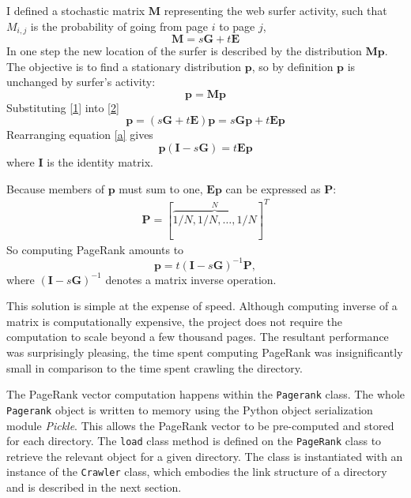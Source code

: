\documentclass[12pt,notitlepage,twoside]{scrreprt}
\begin{document}
I defined a stochastic matrix \(\bm{M}\) representing the web surfer activity, such
that \(M_{i,j}\) is the probability of going from page \(i\) to page \(j\), 
\begin{equation} \label{1}
	\bm{M} = s \bm{G} +t \bm{E}
\end{equation}
In one step the new location of the surfer is described by the distribution \(\bm{Mp}\).
The objective is to find a stationary distribution \(\bm{p}\), so by definition \(\bm{p}\) is unchanged by
surfer's activity:
\begin{equation}\label{2}
	\bm{p} = \bm{M}\bm{p}
\end{equation}
Substituting \ref{1} into \ref{2}
\begin{equation} \label{a}
	\bm{p} = (s\bm{G}+t\bm{E})\bm{p} = s\bm{G} \bm{p} + t\bm{E} \bm{p}
\end{equation}
Rearranging equation \ref{a} gives
\begin{equation}
	\bm{p}(\bm{I}-s\bm{G}) = t\bm{E} \bm{p}
\end{equation}
where \(\bm{I}\) is the identity matrix.

Because members of \(\bm{p}\) must sum to one, \(\bm{E} \bm{p}\) can be expressed as \(\bm{P}\):
\begin{gather*}
	\bm{P} = [\overbrace{1/N,1/N,\dots,1/N}^N]^T
\end{gather*}
So computing PageRank amounts to
\begin{equation}
	\bm{p}  = t(\bm{I}-s\bm{G})^{-1}\bm{P},
\end{equation}
where \((\bm{I}-s\bm{G})^{-1}\) denotes a matrix inverse operation.

This solution is simple at the expense of speed. Although computing inverse of a matrix is
computationally expensive, the project does not require the computation to scale beyond a
few thousand pages. The resultant performance was surprisingly pleasing, the time
spent computing PageRank was insignificantly small in comparison to the time spent
crawling the directory.

The PageRank vector computation happens within the \texttt{Pagerank} class. The
whole \texttt{Pagerank} object is written to memory using the Python object
serialization module \textit{Pickle}. This allows the PageRank vector to be pre-computed
and stored for each directory. The \texttt{load} class method is defined
on the \texttt{PageRank} class to retrieve the relevant object for a given
directory. The class is instantiated with an instance of the \texttt{Crawler}
class, which embodies the link structure of a directory and is described in the
next section.
\end{document}
